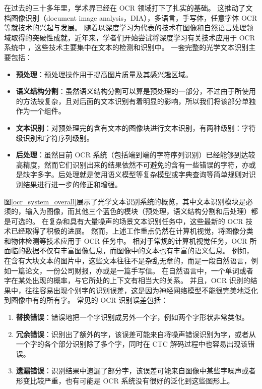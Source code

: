在过去的三十多年里，学术界已经在 OCR 领域打下了扎实的基础。
这推动了文档图像识别（document image analysis，DIA），多语言，手写体，任意字体 OCR 等就技术的兴起与发展。
随着以深度学习为代表的技术在图像和自然语言处理领域取得的突破性成就，近年来，学者们开始尝试将深度学习有关技术应用于 OCR 系统中 \cite{CRNN,MFCNN,SEE,CTPN}，这些技术主要集中在文本的检测和识别中。
一套完整的光学文本识别主要包括：

\begin{itemize}
	\item \textbf{预处理}：预处理操作用于提高图片质量及其感兴趣区域。
	\item \textbf{语义结构分割}：虽然语义结构分割可以算是预处理的一部分，不过由于所使用的方法较复杂，且对后面的文本识别有着明显的影响，所以我们将该部分单独作为一个组件。
	\item \textbf{文本识别}：对预处理完的含有文本的图像块进行文本识别，有两种级别：字符级识别和字符序列级别。
	\item \textbf{后处理}：虽然目前 OCR 系统（包括端到端的字符序列识别）已经能够到达较高精度，然而它们识别出来的结果依然不可避免的含有一些错误的字符，亦或是缺字多字。后处理就是使用语义模型等复杂模型或字典查询等简单规则对识别结果进行进一步的修正和增强。
\end{itemize}

图\ref{ocr_system_overall}展示了光学文本识别系统的概览，其中文本识别模块是必须的，输入为图像，而其他三个蓝色的模块（预处理，语义结构分割和后处理）都是可选的。
在复杂和具有大量噪声的场景文本识别任务中，这些最新的 OCR 技术已经取得了积极的进展。
然而，上述工作重点仍然在计算机视觉，将图像分类和物体检测等技术应用于 OCR 任务中。
相对于常规的计算机视觉任务，OCR 所面临的数据不仅有丰富图像信息，而图像中的文本也有丰富的语义信息。
例如，在含有大块文本的图片中，这些文本往往不是杂乱无章的，而是一段自然语言，例如一篇论文，一份公司财报，亦或是一篇手写信。
在自然语言中，一个单词或者字在某处出现的概率，与它所处的上下文有相当大的关系。
并且，OCR 识别的结果中，往往容易出现个别字的识别误差，这是因为神经网络模型不能很完美地泛化到图像中有的所有字。
常见的 OCR 识别误差包括：

\begin{enumerate}[(1)]
	\item \textbf{替换错误}：错误地把一个字识别成另外一个字，例如两个字形状非常类似。
	\item \textbf{冗余错误}：识别出了额外的字，该误差可能来自将噪声错误识别为字，或者从一个字的各个部分识别除了多个字，同时在 CTC 解码过程中也容易出现该错误。
	\item \textbf{遗漏错误}：识别结果中遗漏了部分字，该误差可能来自图像中某些字噪声或者形变比较严重，也有可能是 OCR 系统没有很好的泛化到这些图形上。
\end{enumerate}

